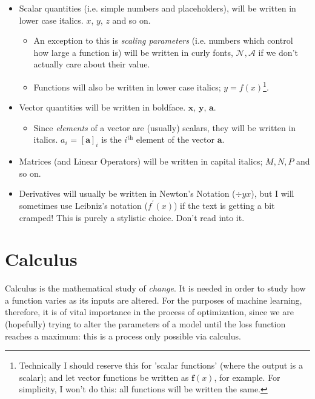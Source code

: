 \documentclass[a4paper,openany,11pt]{book}
\renewcommand\vec[1]{\boldsymbol{\mathbf{#1}}}
\begin{document}
				\begin{itemize}
					\item Scalar quantities (i.e. simple numbers and placeholders), will be written in lower case italics. $x$, $y$, $z$ and so on. 
					\begin{itemize}
						\item An exception to this is \textit{scaling parameters} (i.e. numbers which control how large a function is) will be written in curly fonts, $\mathcal{N}, \mathcal{A}$ if we don't actually care about their value.
						\item Functions will also be written in lower case italics; $y = f(x)$\footnote{Technically I should reserve this for 'scalar functions' (where the output is a scalar); and let vector functions be written as $\vec{f}(x)$, for example. For simplicity, I won't do this: all functions will be written the same.}.
					\end{itemize}
					\item Vector quantities will be written in boldface. $\vec{x}$, $\vec{y}$, $\vec{a}$.
					\begin{itemize}
						\item Since \textit{elements} of a vector are (usually) scalars, they will be written in italics. $a_i$ = $[\vec{a}]_i$ is the $i^\text{th}$ element of the vector $\vec{a}$.
					\end{itemize}
					\item Matrices (and Linear Operators) will be written in capital italics; $M, N, P$ and so on.
					\item Derivatives will usually be written in Newton's Notation ($\div{y}{x}$), but I will sometimes use Leibniz's notation ($f^\prime(x)$) if the text is getting a bit cramped! This is purely a stylistic choice. Don't read into it.
				\end{itemize}
		

		\chapter{Calculus}

			Calculus is the mathematical study of \textit{change}. It is needed in order to study how a function varies as its inputs are altered. For the purposes of machine learning, therefore, it is of vital importance in the process of optimization, since we are (hopefully) trying to alter the parameters of a model until the loss function reaches a maximum: this is a process only possible via calculus. 
\end{document}

